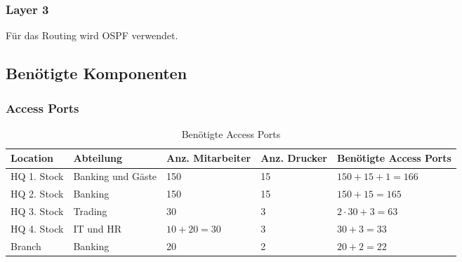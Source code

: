 \subsubsection{Layer 3}
Für das Routing wird OSPF verwendet. 

\subsection{Benötigte Komponenten}
\subsubsection{Access Ports}
\begin{table}[h]
	\centering
	\begin{tabu} to \linewidth {l l l l l}
		\toprule 
		Location & Abteilung & Anz. Mitarbeiter & Anz. Drucker & Benötigte Access Ports \\
		\midrule
		HQ 1. Stock & Banking und Gäste & 150 & 15 & $150 + 15 + 1 = 166$ \\ 
		HQ 2. Stock & Banking & 150 & 15 & $150 + 15 = 165$ \\
		HQ 3. Stock & Trading & 30 & 3 & $2 \cdot 30 + 3 = 63$ \\ 
		HQ 4. Stock & IT und HR & $10 + 20 = 30$ & 3 & $30 + 3 = 33$\\
		Branch  & Banking & 20 & 2 & $20 + 2 = 22$\\
		\bottomrule 
	\end{tabu} 
	\label{tbl:require_access_ports}
	\caption{Benötigte Access Ports}
\end{table}

